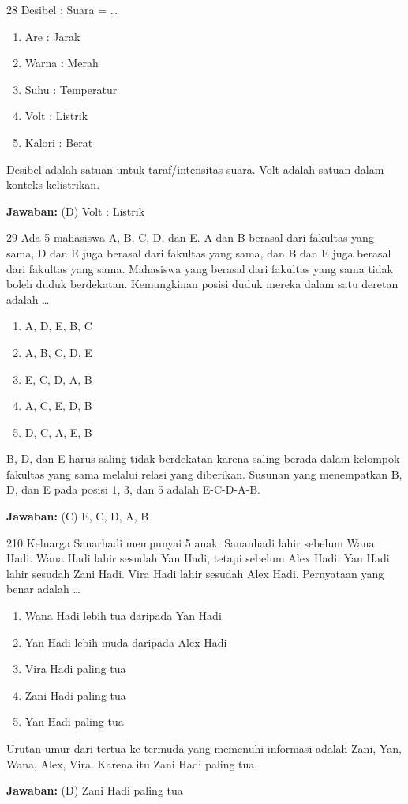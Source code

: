\documentclass[11pt]{article}
\newenvironment{pil}{\begin{enumerate}[label=(\Alph*),leftmargin=*,itemsep=1pt,topsep=3pt]}{\end{enumerate}}
\newcommand{\jw}[1]{\par\smallskip\begin{jawbox}\textbf{Jawaban:} #1\end{jawbox}}
\begin{document}
\begin{soalbox}{2}{8}
Desibel : Suara = \ldots
\begin{pil}\item Are : Jarak \item Warna : Merah \item Suhu : Temperatur \item Volt : Listrik \item Kalori : Berat\end{pil}
\end{soalbox}
\begin{pembox}
Desibel adalah satuan untuk taraf/intensitas suara. Volt adalah satuan dalam konteks kelistrikan.
\jw{(D) Volt : Listrik}
\end{pembox}

\begin{soalbox}{2}{9}
Ada 5 mahasiswa A, B, C, D, dan E. A dan B berasal dari fakultas yang sama, D dan E juga berasal dari fakultas yang sama, dan B dan E juga berasal dari fakultas yang sama. Mahasiswa yang berasal dari fakultas yang sama tidak boleh duduk berdekatan. Kemungkinan posisi duduk mereka dalam satu deretan adalah \ldots
\begin{pil}\item A, D, E, B, C \item A, B, C, D, E \item E, C, D, A, B \item A, C, E, D, B \item D, C, A, E, B\end{pil}
\end{soalbox}
\begin{pembox}
B, D, dan E harus saling tidak berdekatan karena saling berada dalam kelompok fakultas yang sama melalui relasi yang diberikan. Susunan yang menempatkan B, D, dan E pada posisi 1, 3, dan 5 adalah E-C-D-A-B.
\jw{(C) E, C, D, A, B}
\end{pembox}

\begin{soalbox}{2}{10}
Keluarga Sanarhadi mempunyai 5 anak. Sananhadi lahir sebelum Wana Hadi. Wana Hadi lahir sesudah Yan Hadi, tetapi sebelum Alex Hadi. Yan Hadi lahir sesudah Zani Hadi. Vira Hadi lahir sesudah Alex Hadi. Pernyataan yang benar adalah \ldots
\begin{pil}\item Wana Hadi lebih tua daripada Yan Hadi \item Yan Hadi lebih muda daripada Alex Hadi \item Vira Hadi paling tua \item Zani Hadi paling tua \item Yan Hadi paling tua\end{pil}
\end{soalbox}
\begin{pembox}
Urutan umur dari tertua ke termuda yang memenuhi informasi adalah Zani, Yan, Wana, Alex, Vira. Karena itu Zani Hadi paling tua.
\jw{(D) Zani Hadi paling tua}
\end{pembox}
\end{document}
